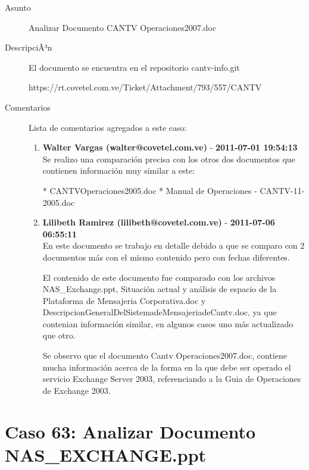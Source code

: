 \begin{description}

\item[Asunto] Analizar Documento CANTV Operaciones2007.doc\item[DescripciÃ³n] El documento se encuentra en el repositorio cantv-info.git

https://rt.covetel.com.ve/Ticket/Attachment/793/557/CANTV%

\item[Comentarios] Lista de comentarios agregados a este caso:  
\begin{enumerate}
        \item {\bfseries Walter Vargas (walter@covetel.com.ve)  } - {\bfseries 2011-07-01 19:54:13} \\ Se realizo una comparación precisa con los otros dos documentos que contienen
información muy similar a este:

* CANTVOperaciones2005.doc
* Manual de Operaciones - CANTV-11-2005.doc        \item {\bfseries Lilibeth Ramirez (lilibeth@covetel.com.ve)  } - {\bfseries 2011-07-06 06:55:11} \\ En este documento se trabajo en detalle debido a que se comparo con 2
documentos más con el mismo contenido pero con fechas diferentes.

El contenido de este documento fue comparado con los archivos NAS_Exchange.ppt,
Situación actual y análisis de espacio de la Plataforma de Mensajeria
Corporativa.doc y DescripcionGeneralDelSistemadeMensajeriadeCantv.doc, ya que
contenian información similar, en algunos casos uno más actualizado que otro.

Se observo que el documento Cantv Operaciones2007.doc, contiene mucha
información acerca de la forma en la que debe ser operado el servicio Exchange
Server 2003, referenciando a la Guia de Operaciones de Exchange 2003.    \end{enumerate}

\end{description}

\section{Caso 63: Analizar Documento NAS_EXCHANGE.ppt }


